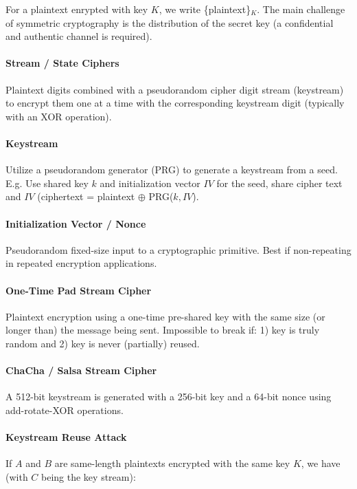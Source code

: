 For a plaintext enrypted with key $K$, we write \{plaintext\}$_K$. The main challenge of symmetric cryptography is the distribution of the secret key (a confidential and authentic channel is required).

\paragraph{Stream / State Ciphers}
Plaintext digits combined with a pseudorandom cipher digit stream (keystream) to encrypt them one at a time with the corresponding keystream digit (typically with an XOR operation).

\paragraph{Keystream}
Utilize a pseudorandom generator (PRG) to generate a keystream from a seed.
E.g. Use shared key $k$ and initialization vector $IV$ for the seed, share cipher text and $IV$ (ciphertext = plaintext $\oplus$ PRG($k, IV$).

\paragraph{Initialization Vector / Nonce}
Pseudorandom fixed-size input to a cryptographic primitive. Best if non-repeating in repeated encryption applications.

\paragraph{One-Time Pad Stream Cipher}
Plaintext encryption using a one-time pre-shared key with the same size (or longer than) the message being sent. Impossible to break if: 1) key is truly random and 2) key is never (partially) reused.

\paragraph{ChaCha / Salsa Stream Cipher}
A 512-bit keystream is generated with a 256-bit key and a 64-bit nonce using add-rotate-XOR operations. %

\paragraph{Keystream Reuse Attack}
If $A$ and $B$ are same-length plaintexts encrypted with the same key $K$, we have (with $C$ being the key stream):

